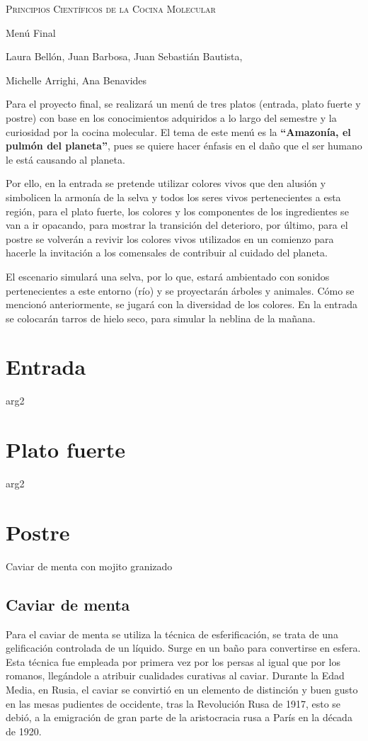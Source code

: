 \documentclass{scrartcl}
\newcommand{\msection}[2]{\section{#1}{\color{Maroon}\fontspec{Zapfino.ttf}\begin{center}#2\end{center}}}
\begin{document}
 
	\pagecolor{fondpaille}
	\begin{center}
		\scshape
		\color{Maroon}            
		Principios Científicos de la Cocina Molecular
			
		\huge
		Menú Final
		
		\vspace{1cm}
		\footnotesize
		Laura Bellón, Juan Barbosa, Juan Sebastián Bautista,
		
		Michelle Arrighi, Ana Benavides
	\end{center}
	
	\Large
	
	Para el proyecto final, se realizará un menú de tres platos (entrada, plato fuerte y postre) con base en los conocimientos adquiridos a lo largo del semestre y la curiosidad por la cocina molecular. El tema de este menú es la \textbf{“Amazonía, el pulmón del planeta”}, pues se quiere hacer énfasis en el daño que el ser humano le está causando al planeta.  
	
	Por ello, en la entrada se pretende utilizar colores vivos que den alusión y simbolicen la armonía de la selva y todos los seres vivos pertenecientes a esta región, para el plato fuerte, los colores y los componentes de los ingredientes se van a ir opacando, para mostrar la transición del deterioro, por último, para el postre se volverán a revivir los colores vivos utilizados en un comienzo para hacerle la invitación a los comensales de contribuir al cuidado del planeta.  
	
	El escenario simulará una selva, por lo que, estará ambientado con sonidos pertenecientes a este entorno (río) y se proyectarán árboles y animales. Cómo se mencionó anteriormente, se jugará con la diversidad de los colores. En la entrada se colocarán tarros de hielo seco, para simular la neblina de la mañana.
	
	\newpage
	\tableofcontents
	
	\newpage
	\msection{Entrada}{arg2}
	\msection{Plato fuerte}{arg2}
	
	\newpage
	\msection{Postre}{Caviar de menta con mojito granizado}
	\subsection{Caviar de menta}
	Para el caviar de menta se utiliza la técnica de esferificación, se trata de una gelificación controlada de un líquido. Surge en un baño para convertirse en esfera. Esta técnica fue empleada por primera vez por los persas al igual que por los romanos, llegándole a atribuir cualidades curativas al caviar. Durante la Edad Media, en Rusia, el caviar se convirtió en un elemento de distinción y buen gusto en las mesas pudientes de occidente, tras la Revolución Rusa de 1917, esto se debió, a la emigración de gran parte de la aristocracia rusa a París en la década de 1920. \cite{davidson2014oxford}
	
\end{document}
